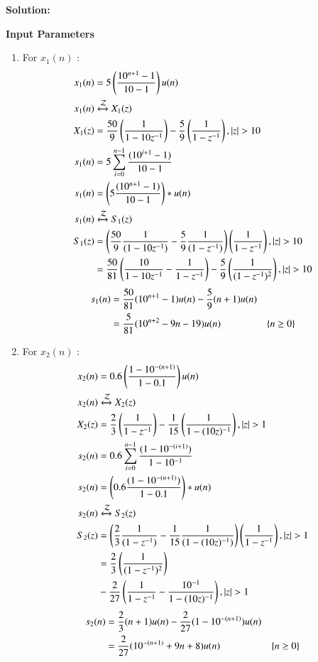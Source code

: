 \documentclass[journal,12pt,twocolumn]{IEEEtran}
\theoremstyle{remark}
\begin{document}
\textbf{Solution:}
\begin{table}[h!]
    \centering
    
    \caption{\textbf{Input Parameters}}
    \label{tab: table_sr5}
\end{table} 
\begin{enumerate}
\item For $x_1(n)$ :
\begin{align}
x_1(n) &= 5\left(\frac{10^{n+1}-1}{10-1}\right)u(n)\\
x_1(n) & \xleftrightarrow{\mathcal{Z}} X_1(z)\\
X_1(z) &= \frac{50}{9}\left(\frac{1}{1-10z^{-1}}\right)-\frac{5}{9}\left(\frac{1}{1-z^{-1}}\right), \lvert z \rvert > 10\\
s_1(n) &= 5  \sum_{i=0}^{n-1} \frac{(10^{i+1} -1)}{10-1}\\
s_1(n) &= \left(5\frac{(10^{n+1}-1)}{10-1}\right)*u(n)\\
s_1(n) & \xleftrightarrow{\mathcal{Z}} S_1(z)\\
S_1(z) &= \left(\frac{50}{9}\frac{1}{(1-10z^{-1})}-\frac{5}{9}\frac{1}{(1-z^{-1})}\right)\left(\frac{1}{1-z^{-1}}\right) ,\lvert z \rvert > 10\\
       &=\frac{50}{81}\left(\frac{10}{1-10z^{-1}}-\frac{1}{1-z^{-1}}\right)-\frac{5}{9}\left(\frac{1}{(1-z^{-1})^2}\right) ,\lvert z \rvert > 10
\end{align}
\begin{align}
s_1(n) &=\frac{50}{81}(10^{n+1}-1)u(n)-\frac{5}{9}(n+1)u(n)\\
       &=\frac{5}{81}(10^{n+2}-9n-19)u(n)  & \left\{n\geq0\right\}
\end{align}
\item For $x_2(n)$ :
\begin{align}
x_2(n) &= 0.6 \left(\frac{1-10^{-(n+1)}}{1-0.1}\right)u(n)\\
x_2(n) & \xleftrightarrow{\mathcal{Z}} X_2(z)\\
X_2(z) &= \frac{2}{3}\left(\frac{1}{1-z^{-1}}\right)-\frac{1}{15}\left(\frac{1}{1-(10z)^{-1}}\right) ,\lvert z \rvert > 1 \\
s_2(n) &= 0.6 \sum_{i=0}^{n-1} \frac{(1-10^{-(i+1)})}{1-10^{-1}}\\
s_2(n) &= \left(0.6 \frac{(1-10^{-(n+1)})}{1-0.1}\right)*u(n)\\
s_2(n) & \xleftrightarrow{\mathcal{Z}} S_2(z)\\
S_2(z) &= \left(\frac{2}{3}\frac{1}{(1-z^{-1})}-\frac{1}{15}\frac{1}{(1-(10z)^{-1})}\right)\left(\frac{1}{1-z^{-1}}\right), \lvert z \rvert > 1\\
   &=\frac{2}{3}\left(\frac{1}{(1-z^{-1})^2}\right)\notag\\
   &-\frac{2}{27}\left(\frac{1}{1-z^{-1}}-\frac{10^{-1}}{1-(10z)^{-1}}\right),\lvert z \rvert > 1
 \end{align}
\begin{align}
s_2(n) &=\frac{2}{3}(n+1)u(n)-\frac{2}{27}(1-10^{-(n+1)})u(n)\\
       &= \frac{2}{27}(10^{-(n+1)}+9n+8)u(n)  & \left\{n\geq0\right\}
\end{align}
\end{enumerate}
\end{document}
